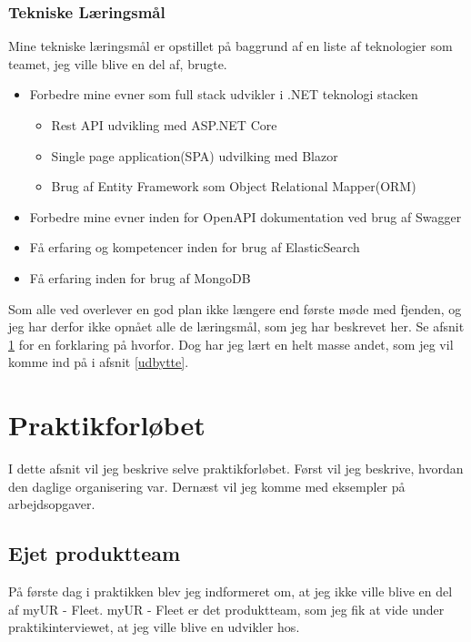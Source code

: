 \documentclass[a4paper]{article}
\begin{document}
\subsubsection*{Tekniske Læringsmål}
Mine tekniske læringsmål er opstillet på baggrund af en liste af teknologier
som teamet, jeg ville blive en del af, brugte.

\begin{itemize}
    \item Forbedre mine evner som full stack udvikler i .NET teknologi stacken
    \begin{itemize}
        \item Rest API udvikling med ASP.NET Core
        \item Single page application(SPA) udvilking med Blazor
        \item Brug af Entity Framework som Object Relational Mapper(ORM)
    \end{itemize}
    \item Forbedre mine evner inden for OpenAPI dokumentation ved brug af
    Swagger
    \item Få erfaring og kompetencer inden for brug af ElasticSearch
    \item Få erfaring inden for brug af MongoDB
\end{itemize}

Som alle ved overlever en god plan ikke længere end første møde med fjenden,
og jeg har derfor ikke opnået alle de læringsmål, som jeg har beskrevet her.
Se afsnit \ref{praktikforloeb} for en forklaring på hvorfor.
Dog har jeg lært en helt masse andet, 
som jeg vil komme ind på i afsnit \ref{udbytte}.

\newpage
\section{Praktikforløbet}
\label{praktikforloeb}
I dette afsnit vil jeg beskrive selve praktikforløbet.
Først vil jeg beskrive, hvordan den daglige organisering var.
Dernæst vil jeg komme med eksempler på arbejdsopgaver.

\subsection{Ejet produktteam}
På første dag i praktikken blev jeg indformeret om,
at jeg ikke ville blive en del af myUR - Fleet.
myUR - Fleet er det produktteam, som jeg fik at vide under praktikinterviewet,
at jeg ville blive en udvikler hos.
\end{document}
